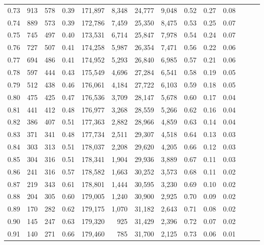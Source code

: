 \begin{tabular}{rrrrrrrrrrrrrr}
0.73 &    913 &  578 &  0.39 &  171,897 &    8,348 &  24,777 &   9,048 &  0.52 &  0.27 &      0.08 \\
0.74 &    889 &  573 &  0.39 &  172,786 &    7,459 &  25,350 &   8,475 &  0.53 &  0.25 &      0.07 \\
0.75 &    745 &  497 &  0.40 &  173,531 &    6,714 &  25,847 &   7,978 &  0.54 &  0.24 &      0.07 \\
0.76 &    727 &  507 &  0.41 &  174,258 &    5,987 &  26,354 &   7,471 &  0.56 &  0.22 &      0.06 \\
0.77 &    694 &  486 &  0.41 &  174,952 &    5,293 &  26,840 &   6,985 &  0.57 &  0.21 &      0.06 \\
0.78 &    597 &  444 &  0.43 &  175,549 &    4,696 &  27,284 &   6,541 &  0.58 &  0.19 &      0.05 \\
0.79 &    512 &  438 &  0.46 &  176,061 &    4,184 &  27,722 &   6,103 &  0.59 &  0.18 &      0.05 \\
0.80 &    475 &  425 &  0.47 &  176,536 &    3,709 &  28,147 &   5,678 &  0.60 &  0.17 &      0.04 \\
0.81 &    441 &  412 &  0.48 &  176,977 &    3,268 &  28,559 &   5,266 &  0.62 &  0.16 &      0.04 \\
0.82 &    386 &  407 &  0.51 &  177,363 &    2,882 &  28,966 &   4,859 &  0.63 &  0.14 &      0.04 \\
0.83 &    371 &  341 &  0.48 &  177,734 &    2,511 &  29,307 &   4,518 &  0.64 &  0.13 &      0.03 \\
0.84 &    303 &  313 &  0.51 &  178,037 &    2,208 &  29,620 &   4,205 &  0.66 &  0.12 &      0.03 \\
0.85 &    304 &  316 &  0.51 &  178,341 &    1,904 &  29,936 &   3,889 &  0.67 &  0.11 &      0.03 \\
0.86 &    241 &  316 &  0.57 &  178,582 &    1,663 &  30,252 &   3,573 &  0.68 &  0.11 &      0.02 \\
0.87 &    219 &  343 &  0.61 &  178,801 &    1,444 &  30,595 &   3,230 &  0.69 &  0.10 &      0.02 \\
0.88 &    204 &  305 &  0.60 &  179,005 &    1,240 &  30,900 &   2,925 &  0.70 &  0.09 &      0.02 \\
0.89 &    170 &  282 &  0.62 &  179,175 &    1,070 &  31,182 &   2,643 &  0.71 &  0.08 &      0.02 \\
0.90 &    145 &  247 &  0.63 &  179,320 &      925 &  31,429 &   2,396 &  0.72 &  0.07 &      0.02 \\
0.91 &    140 &  271 &  0.66 &  179,460 &      785 &  31,700 &   2,125 &  0.73 &  0.06 &      0.01 \\

\end{tabular}
